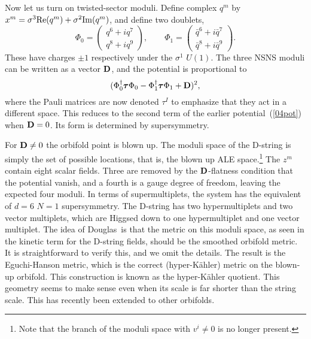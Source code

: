 Now let us turn on twisted-sector moduli.  Define complex $q^m$ 
by $x^m = \sigma^3 {\rm Re}(q^m) + \sigma^2 {\rm Im}(q^m)$, and define two
doublets,
\begin{equation}
\Phi_0 = \left( \begin{array}{c} q^6 + i q^7 \\ q^8 + i q^9
\end{array} \right), \qquad
\Phi_1 = \left( \begin{array}{c} \bar q^6 + i \bar q^7 \\ \bar q^8 + i
\bar q^9
\end{array} \right).
\end{equation}
These have charges $\pm 1$ respectively under the $\sigma^1$ $U(1)$.
The three NSNS moduli can be written as a vector ${\bf D}$,
and the potential is proportional to
\begin{equation}
(\Phi_0^\dagger \mbox{\boldmath$\tau$} \Phi_0 - \Phi_1^\dagger
\mbox{\boldmath$\tau$} \Phi_1 + {\bf D})^2,
\end{equation}
where the Pauli matrices are now denoted $\tau^I$ to emphasize that they
act in a different space.  This reduces to the second term of the
earlier potential~(\ref{04pot}) when ${\bf D} = 0$.  Its form
is determined by supersymmetry.

For ${\bf D} \neq 0$ the
orbifold point is blown up.  The moduli space
of the D-string is simply the set of possible locations, that is, the
blown up ALE space.\footnote
{Note that the branch of the
moduli space with $v^i \neq 0$ is no longer present.}  The $z^m$ contain
eight scalar fields.  Three are removed by the ${\bf D}$-flatness condition
that the potential vanish, and a fourth is a gauge degree of freedom,
leaving the expected four moduli.  In terms of supermultiplets, the
system has the equivalent of $d=6$ $N=1$ supersymmetry.  The D-string
has two hypermultiplets and two vector multiplets, which
are Higgsed down to one
hypermultiplet and one vector multiplet. 
The idea of
Douglas\,\cite{dougprobe} is that the metric on this moduli space, as seen in
the kinetic term for the D-string fields, should be the smoothed orbifold
metric.  It is straightforward to verify this, and we omit the
details.\cite{tensors}  The result is the Eguchi-Hanson metric,\cite{ale} which
is the correct (hyper-K\"ahler) metric on the blown-up orbifold.  This
construction is known as the hyper-K\"ahler quotient.\cite{hyper}  This
geometry seems to make sense even when its scale is far shorter than the
string scale.  This has recently been extended to other
orbifolds.\cite{cvjmyers}

